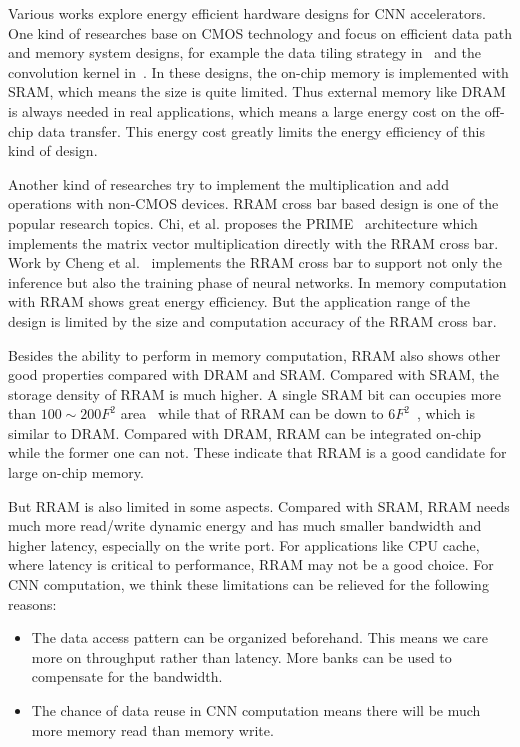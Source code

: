 \documentclass[10pt, conference]{IEEEtran}
\begin{document}
    Various works explore energy efficient hardware designs for CNN accelerators. One kind of researches base on CMOS technology and focus on efficient data path and memory system designs, for example the data tiling strategy in~\cite{zhang2015optimizing} and the convolution kernel in~\cite{qiu2016going}\cite{du2015shidiannao}. In these designs, the on-chip memory is implemented with SRAM, which means the size is quite limited. Thus external memory like DRAM is always needed in real applications, which means a large energy cost on the off-chip data transfer. This energy cost greatly limits the energy efficiency of this kind of design.
    
    Another kind of researches try to implement the multiplication and add operations with non-CMOS devices. RRAM cross bar based design is one of the popular research topics. Chi, et al. proposes the PRIME~\cite{chi2016prime} architecture which implements the matrix vector multiplication directly with the RRAM cross bar. Work by Cheng et al.~\cite{cheng2017time} implements the RRAM cross bar to support not only the inference but also the training phase of neural networks. In memory computation with RRAM shows great energy efficiency. But the application range of the design is limited by the size and computation accuracy of the RRAM cross bar.
    
    Besides the ability to perform in memory computation, RRAM also shows other good properties compared with DRAM and SRAM. Compared with SRAM, the storage density of RRAM is much higher. A single SRAM bit can occupies more than $100\sim 200F^2$ area~\cite{ee598} while that of RRAM can be down to $6F^2$~\cite{fackenthal201419}, which is similar to DRAM. Compared with DRAM, RRAM can be integrated on-chip while the former one can not. These indicate that RRAM is a good candidate for large on-chip memory.
    
    But RRAM is also limited in some aspects. Compared with SRAM, RRAM needs much more read/write dynamic energy and has much smaller bandwidth and higher latency, especially on the write port. For applications like CPU cache, where latency is critical to performance, RRAM may not be a good choice. For CNN computation, we think these limitations can be relieved for the following reasons:
    \begin{itemize}
    \item {The data access pattern can be organized beforehand. This means we care more on throughput rather than latency. More banks can be used to compensate for the bandwidth.}
    \item {The chance of data reuse in CNN computation means there will be much more memory read than memory write.}
    \end{itemize}
    
\end{document}
